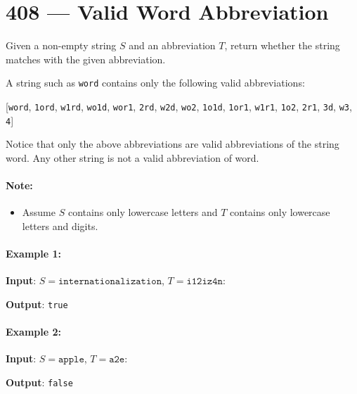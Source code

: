 \section{408 --- Valid Word Abbreviation}
Given a non-empty string $S$ and an abbreviation $T$, return whether the string matches with the given abbreviation.

A string such as \texttt{word} contains only the following valid abbreviations:

[\texttt{word}, \texttt{1ord}, \texttt{w1rd}, \texttt{wo1d}, \texttt{wor1}, \texttt{2rd}, \texttt{w2d}, \texttt{wo2}, \texttt{1o1d}, \texttt{1or1}, \texttt{w1r1}, \texttt{1o2}, \texttt{2r1}, \texttt{3d}, \texttt{w3}, \texttt{4}]

Notice that only the above abbreviations are valid abbreviations of the string word. Any other string is not a valid abbreviation of word.

\paragraph{Note:}

\begin{itemize}
\item Assume $S$ contains only lowercase letters and $T$ contains only lowercase letters and digits.
\end{itemize}

\paragraph{Example 1:}
\begin{flushleft}
\textbf{Input}: $S = \texttt{internationalization}$, $T = \texttt{i12iz4n}$:

\textbf{Output}: \texttt{true}
\end{flushleft}

\paragraph{Example 2:}

\begin{flushleft}
\textbf{Input}: $S = \texttt{apple}$, $T = \texttt{a2e}$:

\textbf{Output}: \texttt{false}
\end{flushleft}

